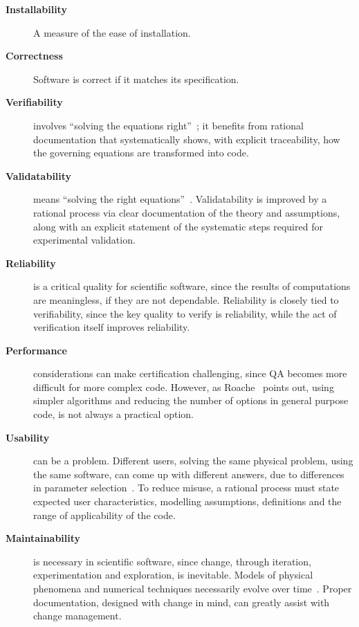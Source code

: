\documentclass[12pt]{article}
\begin{document}
\begin{description}%

\item [\textbf{Installability}] A measure of the ease of installation.

\item [\textbf{Correctness}] Software is correct if it matches its specification.

\item [\textbf{Verifiability}] involves ``solving the equations
  right''~\cite[p.~23]{Roache1998}; it benefits from rational documentation
  that systematically shows, with explicit traceability, how the governing
  equations are transformed into code.

\item [\textbf{Validatability}] means ``solving the right
  equations''~\cite[p.~23]{Roache1998}.  Validatability is improved by a
  rational process via clear documentation of the theory and assumptions, along
  with an explicit statement of the systematic steps required for experimental
  validation.

\item [\textbf{Reliability}] is a critical quality for scientific software,
  since the results of computations are meaningless, if they are not dependable.
  Reliability is closely tied to verifiability, since the key quality to verify
  is reliability, while the act of verification itself improves reliability.

\item [\textbf{Performance}] considerations can make certification challenging,
  since QA becomes more difficult for more complex code.  However, as
  Roache~\cite[p.~355]{Roache1998} points out, using simpler algorithms and
  reducing the number of options in general purpose code, is not always a
  practical option.

\item [\textbf{Usability}] can be a problem.  Different users, solving the same
  physical problem, using the same software, can come up with different answers,
  due to differences in parameter selection~\cite[p.~370]{Roache1998}.  To
  reduce misuse, a rational process must state expected user characteristics,
  modelling assumptions, definitions and the range of applicability of the code.

\item [\textbf{Maintainability}] is necessary in scientific software, since change,
  through iteration, experimentation and exploration, is inevitable.  Models of
  physical phenomena and numerical techniques necessarily evolve over
  time~\cite{CarverEtAl2007, SegalAndMorris2008}.  Proper documentation,
  designed with change in mind, can greatly assist with change management.%


\end{description}
\end{document}
